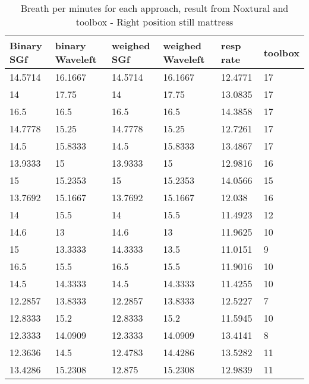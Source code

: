 \begin{table}\begin{tabular}{|llllll|}
\hline 
Binary SGf & binary Waveleft & weighed  SGf & weighed Waveleft & resp rate & toolbox \\ 

\hline 
14.5714 & 16.1667 & 14.5714 & 16.1667 & 12.4771 & 17 \\ 
14 & 17.75 & 14 & 17.75 & 13.0835 & 17 \\ 
16.5 & 16.5 & 16.5 & 16.5 & 14.3858 & 17 \\ 
14.7778 & 15.25 & 14.7778 & 15.25 & 12.7261 & 17 \\ 
14.5 & 15.8333 & 14.5 & 15.8333 & 13.4867 & 17 \\ 
13.9333 & 15 & 13.9333 & 15 & 12.9816 & 16 \\ 
15 & 15.2353 & 15 & 15.2353 & 14.0566 & 15 \\ 
13.7692 & 15.1667 & 13.7692 & 15.1667 & 12.038 & 16 \\ 
14 & 15.5 & 14 & 15.5 & 11.4923 & 12 \\ 
14.6 & 13 & 14.6 & 13 & 11.9625 & 10 \\ 
15 & 13.3333 & 14.3333 & 13.5 & 11.0151 & 9 \\ 
16.5 & 15.5 & 16.5 & 15.5 & 11.9016 & 10 \\ 
14.5 & 14.3333 & 14.5 & 14.3333 & 11.4255 & 10 \\ 
12.2857 & 13.8333 & 12.2857 & 13.8333 & 12.5227 & 7 \\ 
12.8333 & 15.2 & 12.8333 & 15.2 & 11.5945 & 10 \\ 
12.3333 & 14.0909 & 12.3333 & 14.0909 & 13.4141 & 8 \\ 
12.3636 & 14.5 & 12.4783 & 14.4286 & 13.5282 & 11 \\ 
13.4286 & 15.2308 & 12.875 & 15.2308 & 12.9839 & 11 \\ 
\hline 
\end{tabular}
\caption{Breath per minutes for each approach, result from Noxtural and toolbox
- Right position still mattress}
\end{table}